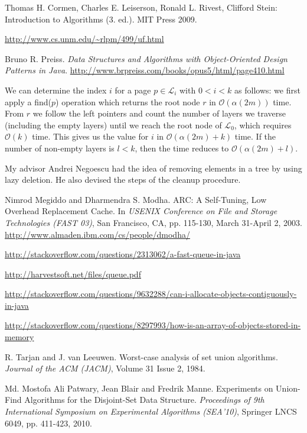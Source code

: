 \documentclass[a4paper,12pt, titlepage]{article}  %
\newcommand{\cl}{\mathcal{L}}   %
\newcommand{\oh}{\mathcal{O}}   %
\begin{document}
\begin{thebibliography}{99}
        Thomas H. Cormen, Charles E. Leiserson, Ronald L. Rivest, Clifford Stein: Introduction to Algorithms (3. ed.). MIT Press 2009.

        \url{http://www.cs.unm.edu/~rlpm/499/uf.html}

	Bruno R. Preiss. \emph{Data Structures and Algorithms with Object-Oriented Design Patterns in Java}.
	\url{http://www.brpreiss.com/books/opus5/html/page410.html}

	We can determine the index $i$ for a page $p \in \cl_i$ with $0<i<k$ as follows:
        we first apply a find($p$) operation which returns the root node $r$ in $\oh(\alpha(2m))$ time.
	From $r$ we follow the left pointers and count the number of layers we traverse (including the empty layers) until we reach the root node of $\cl_0$,
	which requires $\oh(k)$ time. This gives us the value for $i$ in $\oh( \alpha(2m) + k)$ time.
	If the number of non-empty layers is $l<k$, then the time reduces to $\oh( \alpha(2m) + l)$.
       
    	My advisor Andrei Negoescu had the idea of removing elements in a tree by using lazy deletion.
	He also devised the steps of the cleanup procedure.
  
	Nimrod Megiddo and Dharmendra S. Modha. ARC: A Self-Tuning, Low Overhead Replacement Cache. 
        In \emph{USENIX Conference on File and Storage Technologies (FAST 03)}, San Francisco, CA, pp. 115-130, March 31-April 2, 2003. 
	\url{http://www.almaden.ibm.com/cs/people/dmodha/}
	
        \url{http://stackoverflow.com/questions/2313062/a-fast-queue-in-java}

        \url{http://harvestsoft.net/files/queue.pdf}

        \url{http://stackoverflow.com/questions/9632288/can-i-allocate-objects-contiguously-in-java}

        \url{http://stackoverflow.com/questions/8297993/how-is-an-array-of-objects-stored-in-memory}

	R. Tarjan and J. van Leeuwen. Worst-case analysis of set union algorithms. \emph{Journal of the ACM (JACM)}, Volume 31 Issue 2, 1984.

        Md. Mostofa Ali Patwary, Jean Blair and Fredrik Manne. Experiments on Union-Find Algorithms for the Disjoint-Set Data Structure. 
        \emph{Proceedings of 9th International Symposium on Experimental Algorithms (SEA'10)}, Springer LNCS 6049, pp. 411-423, 2010.


\end{thebibliography}
\end{document}
